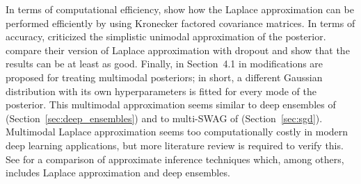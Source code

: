 In terms of computational efficiency, \textcite{ritter2018scalable} show how the Laplace approximation can be performed efficiently by using Kronecker factored covariance matrices. 
In terms of accuracy, \textcite{neal1995bayesian} criticized the simplistic unimodal approximation of the posterior. 
\textcite{ritter2018scalable} compare their version of Laplace approximation with dropout and show that the results can be at least as good. 
Finally, in Section~4.1 in \textcite{mackay1995probable} modifications are proposed for treating multimodal posteriors; in short, a different Gaussian distribution with its own hyperparameters is fitted for every mode of the posterior. 
This multimodal approximation seems similar to deep ensembles of \textcite{lakshminarayanan2017simple} (Section~\ref{sec:deep_ensembles}) and to multi-SWAG of \textcite{wilson2020bayesian} (Section~\ref{sec:sgd}). 
Multimodal Laplace approximation seems too computationally costly in modern deep learning applications, but more literature review is required to verify this.
See \textcite{ashukha2020pitfalls} for a comparison of approximate inference techniques which, among others, includes Laplace approximation and deep ensembles.

